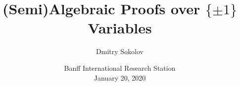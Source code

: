 

\titlegraphic{
    
}


\title[$\{\pm 1\}$ Variables]{
    (Semi)Algebraic Proofs over $\{\pm 1\}$ Variables
}

\author[Sokolov D.]{
    Dmitry Sokolov
}  


\date{Banff International Research Station\\ January 20, 2020}





    \maketitle

    
    
    
%    
    
    

